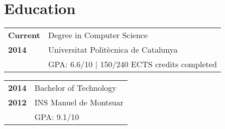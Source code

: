 \section{Education}
\begin{center}

\begin{tabular}{>{\bfseries \hfill} p{2cm} | p{12cm}}
	Current		& Degree in Computer Science 			\\
	2014		& Universitat Politècnica de Catalunya 		\\
	~		& GPA: 6.6/10 | 150/240 ECTS credits completed 	\\
\end{tabular}

\vspace{5mm}

\begin{tabular}{>{\bfseries \hfill} p{2cm} | p{12cm}}
	2014		& Bachelor of Technology 	\\ 
	2012		& INS Manuel de Montsuar 	\\
	~		& GPA: 9.1/10 			\\
\end{tabular}

\end{center}
